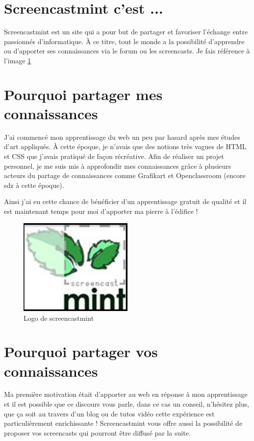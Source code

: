 \documentclass[a4paper,11pt]{article}
\begin{document}
\listoffigures
\section{Screencastmint c'est ...}
Screencastmint est un site qui a pour but de partager et favoriser l'échange entre passionnés d'informatique. À ce titre, tout le monde a la possibilité d'apprendre ou d'apporter ses connaissances via le forum ou les screencasts. Je fais référence à l'image \ref{image1}


\section{Pourquoi partager mes connaissances}
J'ai commencé mon apprentissage du web un peu par hasard après mes études d'art appliqués. À cette époque, je n'avais que des notions très vagues de HTML et CSS que j'avais pratiqué de façon récréative. Afin de réaliser un projet personnel, je me suis mis à approfondir mes connaissances grâce à plusieurs acteurs du partage de connaissances comme Grafikart et Openclassroom (encore sdz à cette époque).

Ainsi j'ai eu cette chance de bénéficier d'un apprentissage gratuit de qualité et il est maintenant temps pour moi d'apporter ma pierre à l'édifice !

\begin{figure}[!h]
\begin{center}
\includegraphics[width=0.5\textwidth]{./image1.jpg}
\caption{Logo de screencastmint}
\label{image1}
\end{center}
\end{figure}



\section{Pourquoi partager vos connaissances}
Ma première motivation était d'apporter au web en réponse à mon apprentissage et il est possible que ce discours vous parle, dans ce cas un conseil, n'hésitez plus, que ça soit au travers d'un blog ou de tutos vidéo cette expérience est particulièrement enrichissante ! Screencastmint vous offre aussi la possibilité de proposer vos screencasts qui pourront être diffusé par la suite.
\end{document}
